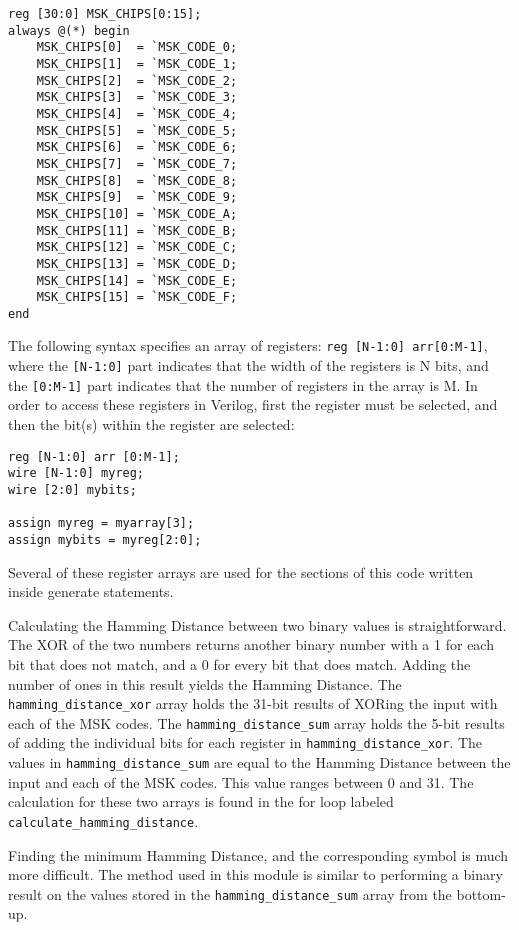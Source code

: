 \begin{lstlisting}
reg [30:0] MSK_CHIPS[0:15];
always @(*) begin
    MSK_CHIPS[0]  = `MSK_CODE_0;
    MSK_CHIPS[1]  = `MSK_CODE_1;
    MSK_CHIPS[2]  = `MSK_CODE_2;
    MSK_CHIPS[3]  = `MSK_CODE_3;
    MSK_CHIPS[4]  = `MSK_CODE_4;
    MSK_CHIPS[5]  = `MSK_CODE_5;
    MSK_CHIPS[6]  = `MSK_CODE_6;
    MSK_CHIPS[7]  = `MSK_CODE_7;
    MSK_CHIPS[8]  = `MSK_CODE_8;
    MSK_CHIPS[9]  = `MSK_CODE_9;
    MSK_CHIPS[10] = `MSK_CODE_A;
    MSK_CHIPS[11] = `MSK_CODE_B;
    MSK_CHIPS[12] = `MSK_CODE_C;
    MSK_CHIPS[13] = `MSK_CODE_D;
    MSK_CHIPS[14] = `MSK_CODE_E;
    MSK_CHIPS[15] = `MSK_CODE_F;
end
\end{lstlisting}

The following syntax specifies an array of registers: \texttt{reg [N-1:0] arr[0:M-1]}, where the \texttt{[N-1:0]} part indicates that the width of the registers is N bits, and the \texttt{[0:M-1]} part indicates that the number of registers in the array is M. In order to access these registers in Verilog, first the register must be selected, and then the bit(s) within the register are selected:

\begin{lstlisting}
reg [N-1:0] arr [0:M-1];
wire [N-1:0] myreg;
wire [2:0] mybits;

assign myreg = myarray[3];
assign mybits = myreg[2:0];
\end{lstlisting}

Several of these register arrays are used for the sections of this code written inside generate statements.

Calculating the Hamming Distance between two binary values is straightforward. The XOR of the two numbers returns another binary number with a 1 for each bit that does not match, and a 0 for every bit that does match. Adding the number of ones in this result yields the Hamming Distance. The \texttt{hamming\_distance\_xor} array holds the 31-bit results of XORing the input with each of the MSK codes. The \texttt{hamming\_distance\_sum} array holds the 5-bit results of adding the individual bits for each register in \texttt{hamming\_distance\_xor}. The values in \texttt{hamming\_distance\_sum} are equal to the Hamming Distance between the input and each of the MSK codes. This value ranges between 0 and 31. The calculation for these two arrays is found in the for loop labeled \texttt{calculate\_hamming\_distance}.

Finding the minimum Hamming Distance, and the corresponding symbol is much more difficult. The method used in this module is similar to performing a binary result on the values stored in the \texttt{hamming\_distance\_sum} array from the bottom-up.

